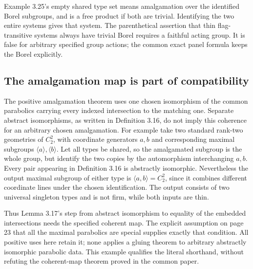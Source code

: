 Example 3.25's empty shared type set means amalgamation over the
identified Borel subgroups, and is a free product if both are
trivial. Identifying the two entire systems gives that system.
The parenthetical assertion that thin flag-transitive systems always
have trivial Borel requires a faithful acting group. It is false
for arbitrary specified group actions; the common exact panel
formula keeps the Borel explicitly.

\subsection{The amalgamation map is part of compatibility}
The positive amalgamation theorem uses one chosen isomorphism of the
common parabolics carrying every indexed intersection to the matching
one. Separate abstract isomorphisms, as written in Definition 3.16,
do not imply this coherence for an arbitrary chosen amalgamation.
For example take two standard rank-two geometries of $C_2^2$, with
coordinate generators $a,b$ and corresponding maximal subgroups
$\langle a\rangle,\langle b\rangle$. Let all types be shared, so
the amalgamated subgroup is the whole group, but identify the two
copies by the automorphism interchanging $a,b$. Every pair appearing
in Definition 3.16 is abstractly isomorphic. Nevertheless the output
maximal subgroup of either type is
$\langle a,b\rangle=C_2^2$, since it combines different coordinate
lines under the chosen identification. The output consists of two
universal singleton types and is not firm, while both inputs are thin.

Thus Lemma 3.17's step from abstract isomorphism to equality of the
embedded intersections needs the specified coherent map. The explicit
assumption on page 23 that all the maximal parabolics are special
supplies exactly that condition. All positive uses here retain it;
none applies a gluing theorem to arbitrary abstractly isomorphic
parabolic data. This example qualifies the literal shorthand, without
refuting the coherent-map theorem proved in the common paper.

